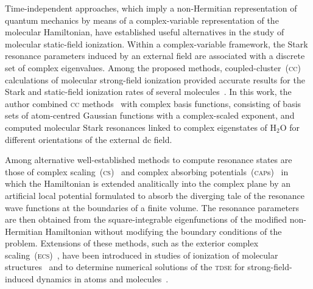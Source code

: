 Time-independent approaches, which imply a non-Hermitian
representation of quantum mechanics by means of a complex-variable
representation of the molecular Hamiltonian, have established useful
alternatives in the study of molecular static-field ionization. Within
a complex-variable framework, the Stark resonance parameters induced
by an external field are associated with a discrete set of complex
eigenvalues. Among the proposed methods, coupled-cluster~(\textsc{cc})
calculations of molecular strong-field ionization provided accurate
results for the Stark and static-field ionization rates of several
molecules~\cite{Jagau_manybody_H2O}. In this work, the author combined
\textsc{cc} methods~\cite{cc_method} with complex basis functions,
consisting of basis sets of atom-centred Gaussian functions with a
complex-scaled exponent, and computed molecular Stark resonances
linked to complex eigenstates of H$_{2}$O for different orientations
of the external dc field.


Among alternative well-established methods to compute resonance states
are those of complex scaling~(\textsc{cs})~\cite{complexScalingSimon}
and complex absorbing potentials~(\textsc{cap}s)~\cite{RissMeyer_1993}
in which the Hamiltonian is extended analitically into the complex
plane by an artificial local potential formulated to absorb the
diverging tale of the resonance wave functions at the boundaries of a
finite volume. The resonance parameters are then obtained from the
square-integrable eigenfunctions of the modified non-Hermitian
Hamiltonian without modifying the boundary conditions of the
problem. Extensions of these methods, such as the exterior complex
scaling~(\textsc{ecs})~\cite{Simon_1979}, have been introduced in
studies of ionization of molecular
structures~\cite{ScrinziJChemPhys_ECS,ScrinziJPhysB_ECS} and to
determine numerical solutions of the \textsc{tdse} for
strong-field-induced dynamics in atoms and
molecules~\cite{Krause_2014,ecsScrinzi,ecsRuiz}.

